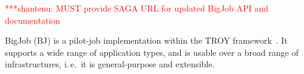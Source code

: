 \documentclass[conference,final]{IEEEtran}
\newcommand{\jhanote}[1]{ {\textcolor{red} { ***shantenu: #1 }}}
\newcommand{\alnote}[1]{ {\textcolor{blue} { ***andre: #1 }}}
\newcommand{\alnote}[1]{}
\newcommand{\jhanote}[1]{}
\begin{document}
\jhanote{MUST provide SAGA URL for updated BigJob API and
  documentation}



BigJob (BJ) is a pilot-job implementation within the TROY
framework~\cite{bigjob_web}. It supports a wide range of application
types, and is usable over a broad range of infrastructures, i.\,e.\ it
is general-purpose and extensible.
\end{document}
